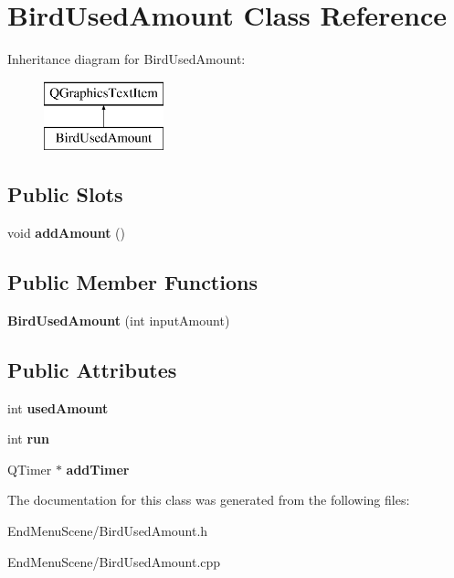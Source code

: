 \hypertarget{classBirdUsedAmount}{}\section{Bird\+Used\+Amount Class Reference}
\label{classBirdUsedAmount}
Inheritance diagram for Bird\+Used\+Amount\+:\begin{figure}[H]
\begin{center}
\leavevmode
\includegraphics[height=2.000000cm]{classBirdUsedAmount}
\end{center}
\end{figure}
\subsection*{Public Slots}
\begin{DoxyCompactItemize}
\item 
void {\bfseries add\+Amount} ()\hypertarget{classBirdUsedAmount_ac64d566977df6e370b204ab06db6a574}{}\label{classBirdUsedAmount_ac64d566977df6e370b204ab06db6a574}

\end{DoxyCompactItemize}
\subsection*{Public Member Functions}
\begin{DoxyCompactItemize}
\item 
{\bfseries Bird\+Used\+Amount} (int input\+Amount)\hypertarget{classBirdUsedAmount_a42811d8fbbfef7780cc105e30c75fa0f}{}\label{classBirdUsedAmount_a42811d8fbbfef7780cc105e30c75fa0f}

\end{DoxyCompactItemize}
\subsection*{Public Attributes}
\begin{DoxyCompactItemize}
\item 
int {\bfseries used\+Amount}\hypertarget{classBirdUsedAmount_a76196a8af37a37e1b19135b404691517}{}\label{classBirdUsedAmount_a76196a8af37a37e1b19135b404691517}

\item 
int {\bfseries run}\hypertarget{classBirdUsedAmount_a7351cd1c0f03c21b1e8dfd0400949781}{}\label{classBirdUsedAmount_a7351cd1c0f03c21b1e8dfd0400949781}

\item 
Q\+Timer $\ast$ {\bfseries add\+Timer}\hypertarget{classBirdUsedAmount_a951a7f66b32e664e18cbf569dd6e22c6}{}\label{classBirdUsedAmount_a951a7f66b32e664e18cbf569dd6e22c6}

\end{DoxyCompactItemize}


The documentation for this class was generated from the following files\+:\begin{DoxyCompactItemize}
\item 
End\+Menu\+Scene/Bird\+Used\+Amount.\+h\item 
End\+Menu\+Scene/Bird\+Used\+Amount.\+cpp\end{DoxyCompactItemize}
